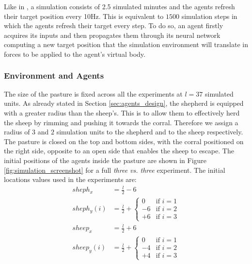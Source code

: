 \documentclass[conference]{IEEEtran}
\begin{document}
Like in \cite{potter2001heterogeneity}, a simulation consists of 2.5 simulated minutes and the agents refresh their target position every 10Hz.
This is equivalent to $1500$ simulation steps in which the agents refresh their target every step.
To do so, an agent firstly acquires its inputs and then propagates them through its neural network computing a new target position that the simulation environment will translate in forces to be applied to the agent's virtual body.


\vspace{0.5em}
\subsubsection{Environment and Agents}
The size of the pasture is fixed across all the experiments at $l = 37$ simulated units.
As already stated in Section \ref{sec:agents_design}, the shepherd is equipped with a greater radius than the sheep's.
This is to allow them to effectively herd the sheep by rimming and pushing it towards the corral.
Therefore we assign a radius of $3$ and $2$ simulation units to the shepherd and to the sheep respectively.
The pasture is closed on the top and bottom sides, with the corral positioned on the right side, opposite to an open side that enables the sheep to escape.
The initial positions of the agents inside the pasture are shown in Figure \ref{fig:simulation_screenshot} for a full \textit{three vs. three} experiment.
The initial locations values used in the experiments are:
\begin{align}
sheph_x &= \frac{l}{2} - 6 \\
sheph_y(i) &= \frac{l}{2} + \begin{cases} 0 & \text{if } i=1 \\ -6 & \text{if } i=2 \\ +6 & \text{if } i=3 \end{cases} \\
sheep_x &= \frac{l}{2} + 6 \\
sheep_y(i) &= \frac{l}{2} + \begin{cases} 0 & \text{if } i=1 \\ -4 & \text{if } i=2 \\ +4 & \text{if } i=3 \end{cases}
\end{align}
\end{document}
